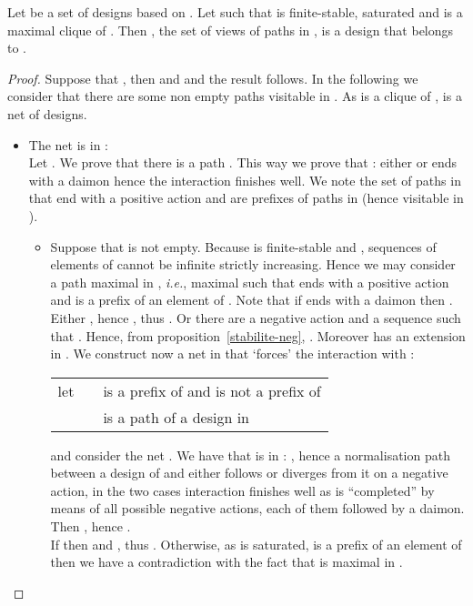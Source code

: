 \documentclass{LMCS}
\def\ie{{\em i.e.}}
\begin{document}
 
\begin{prop}\label{prop:clique_dual}
Let  be a set of designs based on . Let  such that  is finite-stable, saturated and  is a maximal clique of . Then , the set of views of paths in , is a design that belongs to .
\end{prop}
\begin{proof}
Suppose that , then  and  and the result follows.
In the following we consider that there are some non empty paths visitable in .
As  is a clique of ,  is a net of designs.
\begin{itemize}
\item The net  is in :\\
Let . We prove that there is a path . This way we prove that  : either  or  ends with a daimon hence the interaction finishes well. We note  the set of paths in  that end with a positive action and  are prefixes of paths in  (hence visitable in ).
\begin{itemize}
\item Suppose that  is not empty. Because  is finite-stable and , sequences of elements of  cannot be infinite strictly increasing. Hence we may consider a path  maximal in , \ie, maximal such that  ends with a positive action and is a prefix of an element of . Note that if  ends with a daimon then .
Either , hence , thus . 
Or there are a negative action  and a sequence  such that . Hence, from proposition~\ref{stabilite-neg}, .
Moreover  has an extension  in . 
We construct now a net in  that `forces' the interaction with :

\begin{tabular}{lcl}
let  &  &  is a prefix of  and  is not a prefix of  \\
	&&  is a path of a design in 
\end{tabular}

 and consider the net .
We have that  is in : , hence a normalisation path between a design of  and  either follows  or diverges from it on a negative action, in the two cases interaction finishes well as  is ``completed'' by means of all possible negative actions, each of them followed by a daimon. 
Then , hence .\\
If  then  and , thus . 
Otherwise, as  is saturated,  is a prefix of an element of   then we have a contradiction with the fact that  is maximal in .


\end{itemize}
\end{itemize}
\end{proof}
\end{document}
